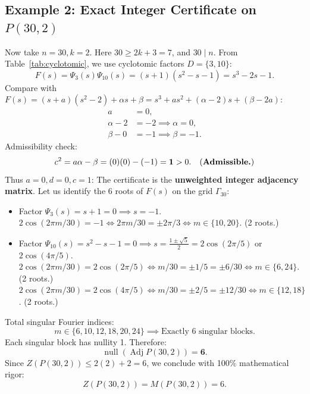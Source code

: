 \documentclass[11pt]{article}
\begin{document}
\subsection{Example 2: Exact Integer Certificate on $P(30,2)$}

Now take $n=30, k=2$. Here $30 \ge 2k+3 = 7$, and $30 \mid n$.
From Table~\ref{tab:cyclotomic}, we use cyclotomic factors $D = \{3, 10\}$:
\begin{equation}
  F(s) = \Psi_3(s) \Psi_{10}(s) = (s + 1)(s^2 - s - 1) = s^3 - 2s - 1.
\end{equation}
Compare with $F(s) = (s+a)(s^2-2) + \alpha s + \beta = s^3 + a s^2 + (\alpha - 2) s + (\beta - 2a)$:
\begin{align}
  a &= 0, \\
  \alpha - 2 &= -2 \implies \alpha = 0, \\
  \beta - 0 &= -1 \implies \beta = -1.
\end{align}
Admissibility check:
\begin{equation}
  c^2 = a\alpha - \beta = (0)(0) - (-1) = \mathbf{1} > 0. \quad \text{(\textbf{Admissible.})}
\end{equation}
Thus $a=0, d=0, c=1$: The certificate is the \textbf{unweighted integer adjacency matrix}.
Let us identify the 6 roots of $F(s)$ on the grid $\Gamma_{30}$:
\begin{itemize}[leftmargin=*,nosep]
  \item Factor $\Psi_3(s) = s + 1 = 0 \implies s = -1$.
  $2\cos(2\pi m / 30) = -1 \iff 2\pi m / 30 = \pm 2\pi/3 \iff m \in \{10, 20\}$. (2 roots.)
  \item Factor $\Psi_{10}(s) = s^2 - s - 1 = 0 \implies s = \frac{1 \pm \sqrt{5}}{2} = 2\cos(2\pi / 5)$ or $2\cos(4\pi / 5)$.
  $2\cos(2\pi m / 30) = 2\cos(2\pi / 5) \iff m/30 = \pm 1/5 = \pm 6/30 \iff m \in \{6, 24\}$. (2 roots.)
  $2\cos(2\pi m / 30) = 2\cos(4\pi / 5) \iff m/30 = \pm 2/5 = \pm 12/30 \iff m \in \{12, 18\}$. (2 roots.)
\end{itemize}
Total singular Fourier indices:
\begin{equation}
  m \in \{6, 10, 12, 18, 20, 24\} \implies \text{Exactly 6 singular blocks.}
\end{equation}
Each singular block has nullity 1. Therefore:
\begin{equation}
  \operatorname{null}(\operatorname{Adj} P(30,2)) = \mathbf{6}.
\end{equation}
Since $Z(P(30,2)) \le 2(2) + 2 = 6$, we conclude with 100\% mathematical rigor:
\begin{equation}
  Z(P(30, 2)) = M(P(30, 2)) = 6.
\end{equation}
\end{document}
